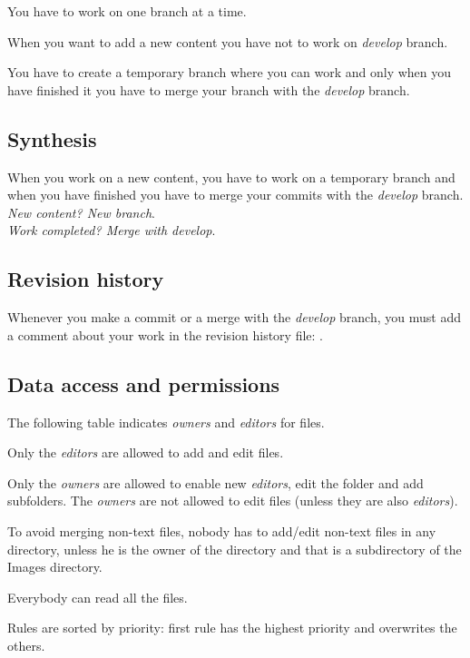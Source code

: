 \documentclass[12pt]{article}
\begin{document}
You have to work on one branch at a time.

When you want to add a new content you have not to work on \textit{develop} branch.

You have to create a temporary branch where you can work and only when you have finished it you have to merge your branch with the \textit{develop} branch.


\subsection*{Synthesis}
When you work on a new content, you have to work on a temporary branch and when you have finished you have to merge your commits with the \textit{develop} branch.\\
\textit{New content? New branch}.\\
\textit{Work completed? Merge with develop}.\\

\subsection*{Revision history}
Whenever you make a commit or a merge with the \textit{develop} branch, you must add a comment about your work in the revision history file: .

\subsection{Data access and permissions}
The following table indicates \textit{owners} and \textit{editors} for files.

Only the \textit{editors} are allowed to add and edit files.

Only the \textit{owners} are allowed to enable new \textit{editors}, edit the folder and add subfolders. The \textit{owners} are not allowed to edit files (unless they are also \textit{editors}).

To avoid merging non-text files, nobody has to add/edit non-text files in any directory, unless he is the owner of the directory and that is a subdirectory of the Images directory.

Everybody can read all the files.

Rules are sorted by priority: first rule has the highest priority and overwrites the others.
\end{document}
